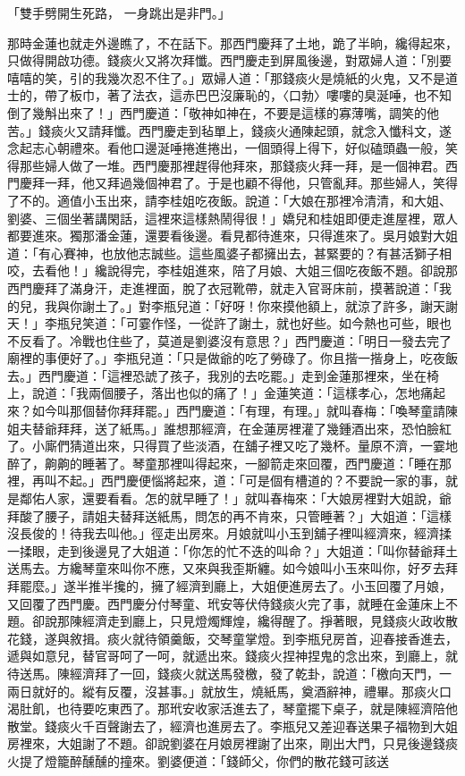 \begin{showcontents}{}
「雙手劈開生死路，  一身跳出是非門。」

那時金蓮也就走外邊瞧了，不在話下。那西門慶拜了土地，跪了半晌，纔得起來，只做得開啟功德。錢痰火又將次拜懺。西門慶走到屏風後邊，對眾婦人道：「別要嘻嘻的笑，引的我幾次忍不住了。」眾婦人道：「那錢痰火是燒紙的火鬼，又不是道士的，帶了板巾，著了法衣，這赤巴巴沒廉恥的，〈口勃〉嘍嘍的臭涎唾，也不知倒了幾斛出來了！」西門慶道：「敬神如神在，不要是這樣的寡薄嘴，調笑的他苦。」錢痰火又請拜懺。西門慶走到毡單上，錢痰火通陳起頭，就念入懺科文，遂念起志心朝禮來。看他口邊涎唾捲進捲出，一個頭得上得下，好似磕頭蟲一般，笑得那些婦人做了一堆。西門慶那裡趕得他拜來，那錢痰火拜一拜，是一個神君。西門慶拜一拜，他又拜過幾個神君了。于是也顧不得他，只管亂拜。那些婦人，笑得了不的。適值小玉出來，請李桂姐吃夜飯。說道：「大娘在那裡冷清清，和大姐、劉婆、三個坐著講閑話，這裡來這樣熱鬧得很！」嬌兒和桂姐即便走進屋裡，眾人都要進來。獨那潘金蓮，還要看後邊。看見都待進來，只得進來了。吳月娘對大姐道：「有心賽神，也放他志誠些。這些風婆子都擁出去，甚緊要的？有甚活獅子相咬，去看他！」纔說得完，李桂姐進來，陪了月娘、大姐三個吃夜飯不題。卻說那西門慶拜了滿身汗，走進裡面，脫了衣冠靴帶，就走入官哥床前，摸著說道：「我的兒，我與你謝土了。」對李瓶兒道：「好呀！你來摸他額上，就涼了許多，謝天謝天！」李瓶兒笑道：「可霎作怪，一從許了謝土，就也好些。如今熱也可些，眼也不反看了。冷戰也住些了，莫道是劉婆沒有意思？」西門慶道：「明日一發去完了廟裡的事便好了。」李瓶兒道：「只是做爺的吃了勞碌了。你且揩一揩身上，吃夜飯去。」西門慶道：「這裡恐諕了孩子，我別的去吃罷。」走到金蓮那裡來，坐在椅上，說道：「我兩個腰子，落出也似的痛了！」金蓮笑道：「這樣孝心，怎地痛起來？如今叫那個替你拜拜罷。」西門慶道：「有理，有理。」就叫春梅：「喚琴童請陳姐夫替爺拜拜，送了紙馬。」誰想那經濟，在金蓮房裡灌了幾鍾酒出來，恐怕臉紅了。小廝們猜道出來，只得買了些淡酒，在舖子裡又吃了幾杯。量原不濟，一霎地醉了，齁齁的睡著了。琴童那裡叫得起來，一腳箭走來回覆，西門慶道：「睡在那裡，再叫不起。」西門慶便惱將起來，道：「可是個有槽道的？不要說一家的事，就是鄰佑人家，還要看看。怎的就早睡了！」就叫春梅來：「大娘房裡對大姐說，爺拜酸了腰子，請姐夫替拜送紙馬，問怎的再不肯來，只管睡著？」大姐道：「這樣沒長俊的！待我去叫他。」徑走出房來。月娘就叫小玉到舖子裡叫經濟來，經濟揉一揉眼，走到後邊見了大姐道：「你怎的忙不迭的叫命？」大姐道：「叫你替爺拜土送馬去。方纔琴童來叫你不應，又來與我歪斯纏。如今娘叫小玉來叫你，好歹去拜拜罷麼。」遂半推半攙的，擁了經濟到廳上，大姐便進房去了。小玉回覆了月娘，又回覆了西門慶。西門慶分付琴童、玳安等伏侍錢痰火完了事，就睡在金蓮床上不題。卻說那陳經濟走到廳上，只見燈燭輝煌，纔得醒了。掙著眼，見錢痰火政收散花錢，遂與敘揖。痰火就待領羹飯，交琴童掌燈。到李瓶兒房首，迎春接香進去，遞與如意兒，替官哥呵了一呵，就遞出來。錢痰火捏神捏鬼的念出來，到廳上，就待送馬。陳經濟拜了一回，錢痰火就送馬發檄，發了乾卦，說道：「檄向天門，一兩日就好的。縱有反覆，沒甚事。」就放生，燒紙馬，奠酒辭神，禮畢。那痰火口渴肚飢，也待要吃東西了。那玳安收家活進去了，琴童擺下桌子，就是陳經濟陪他散堂。錢痰火千百聲謝去了，經濟也進房去了。李瓶兒又差迎春送果子福物到大姐房裡來，大姐謝了不題。卻說劉婆在月娘房裡謝了出來，剛出大門，只見後邊錢痰火提了燈籠醉醺醺的撞來。劉婆便道：「錢師父，你們的散花錢可該送
\end{showcontents}
